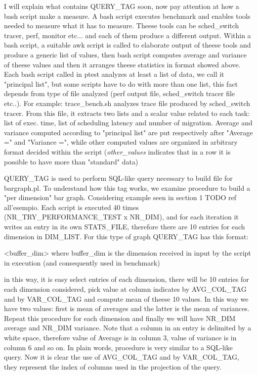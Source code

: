 \documentclass[a4paper,10pt]{article}
\begin{document}
\begin{multicols}{2}
I will explain what contains QUERY\_TAG soon, now pay attention at how a bash script make a measure.
A bash script executes benchmark and enables tools needed to measure what it has to measure.
Theese tools can be sched_switch tracer, perf, monitor etc... and each of them produce a different output. Within a bash script,
a suitable awk script is called to elaborate output of theese tools and produce a generic list of values, then bash script computes average and variance
of theese values and then it arranges theese statistics in format showed above. Each bash script called in ptest analyzes at least a list of data, 
we call it "principal list", but some scripts have to do with more than one list, this fact depends from type
of file analyzed (perf output file, sched_switch tracer file etc..). For example: trace_bench.sh analyzes trace file produced
by sched_switch tracer. From this file, it extracts two lists and a scalar value related to each task: list of exec. time, list of scheduling
latency and number of migration.
Average and variance computed according to "principal list" are put respectively after "Average =" and "Variance =", while other computed values are
organized in arbitrary format decided within the script (\textit{other_values} indicates that in a row it is possible to have more than "standard" data)

QUERY\_TAG is used to perform SQL-like query necessary to build file for bargraph.pl. To understand how this tag works, we examine procedure to build
a "per dimension" bar graph. Considering example seen in section 1 TODO ref all'esempio.
Each script is executed 40 times (NR\_TRY\_PERFORMANCE\_TEST x NR\_DIM), and for each iteration
it writes an entry in its own STATS\_FILE, therefore there are 10 entries for each
dimension in DIM\_LIST. For this type of graph QUERY\_TAG has this format:

<buffer\_dim> where buffer\_dim is the dimension received in input by the script in execution
(and consequently used in benchmark)

in this way, it is easy select entries of each dimension, there will be 10 entries for each 
dimension considered, pick value at column indicates by AVG\_COL\_TAG and by VAR\_COL\_TAG
and compute mean of theese 10 values. In this way we have two values: first is mean
of averages and the latter is the mean of variances. Repeat this procedure for each dimension and finally we
will have NR\_DIM average and NR\_DIM variance. Note that a column in an entry is delimited by
a white space, therefore value of Average is in column 3, value of variance is in column 6 and so on.
In plain words, procedure is very similar to a SQL-like query.
Now it is clear the use of AVG\_COL\_TAG and by VAR\_COL\_TAG, they represent the index of columns used
in the projection of the query.


\end{multicols}
\end{document}
